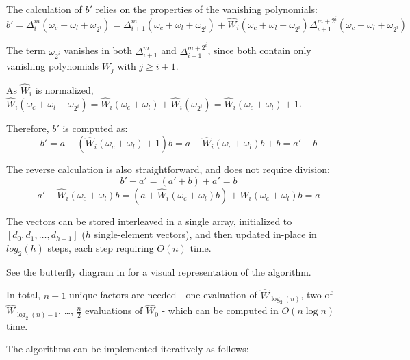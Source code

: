 The calculation of $b'$ relies on the properties of the vanishing polynomials:
\[b' = \Delta_i^{m}(\omega_c + \omega_l + \omega_{2^i}) = \Delta_{i+1}^m(\omega_c + \omega_l + \omega_{2^i}) + \hat{W}_i(\omega_c + \omega_l + \omega_{2^i}) \Delta_{i+1}^{m + 2^i}(\omega_c + \omega_l + \omega_{2^i})\]

The term $\omega_{2^i}$ vanishes in both $\Delta_{i+1}^m$ and $\Delta_{i+1}^{m + 2^i}$, since both contain only vanishing polynomials $W_j$ with $j \geq i + 1$.

As $\hat{W}_i$ is normalized, $\hat{W}_i(\omega_c + \omega_l + \omega_{2^i}) = \hat{W}_i(\omega_c + \omega_l) + \hat{W}_i(\omega_{2^i}) = \hat{W}_i(\omega_c + \omega_l) + 1$.

Therefore, $b'$ is computed as:
\[b' = a + (\hat{W}_i(\omega_c + \omega_l) + 1) b = a + \hat{W}_i(\omega_c + \omega_l) b + b = a' + b\]

The reverse calculation is also straightforward, and does not require division:
\[b' + a' = (a' + b) + a' = b\]
\[a' + \hat{W}_i(\omega_c + \omega_l) b = (a + \hat{W}_i(\omega_c + \omega_l) b) + \hat{W}_i(\omega_c + \omega_l) b = a\]

The vectors can be stored interleaved in a single array, initialized to $[d_0, d_1, \ldots, d_{h - 1}]$ ($h$ single-element vectors), and then updated in-place in $log_2(h)$ steps, each step requiring $O(n)$ time.

See the butterfly diagram in \cite{novel-poly} for a visual representation of the algorithm.

In total, $n - 1$ unique factors are needed - one evaluation of $\hat{W}_{\log_2(n)}$, two of $\hat{W}_{\log_2(n) - 1}$, \ldots, $\frac{n}{2}$ evaluations of $\hat{W}_0$ - which can be computed in $O(n \log n)$ time.

The algorithms can be implemented iteratively as follows:

